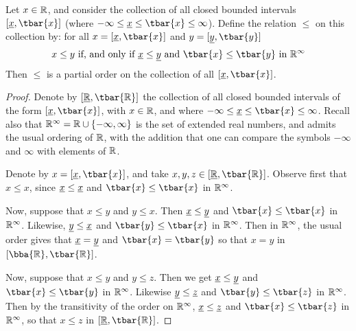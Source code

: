 \begin{proposition}\label{proposition_1.6}
  Let $x \in \mathbb{R}$, and consider the collection of all closed bounded
  intervals $[\bbar{x},\tbar{x}]$ (where $-\infty \leq \bbar{x} \leq
  \tbar{x} \leq \infty$). Define the relation $\leq$ on this collection
  by: for all $x=[\bbar{x},\tbar{x}]$ and $y=[\bbar{y},\tbar{y}]$
  \begin{equation*}
    x \leq y \text{ if, and only if } \bbar{x} \leq \bbar{y} \text{
    and } \tbar{x} \leq \tbar{y} \text{ in } \R^\infty
  \end{equation*}
  Then $\leq$ is a partial order on the collection of all
$[\bbar{x},\tbar{x}]$.
\end{proposition}
\begin{proof}
  Denote by $[\bbar{\R},\tbar{\R}]$ the collection of all closed
  bounded intervals of the form $[\bbar{x},\tbar{x}]$, with $x \in \mathbb{R}$,
  and where $-\infty \leq \bbar{x} \leq \tbar{x} \leq \infty$. Recall
  also that $\mathbb{R}^\infty=\mathbb{R} \cup \{-\infty,\infty\}$ is the set of
  extended real numbers, and admits the usual ordering of $\mathbb{R}$, with
  the addition that one can compare the symbols  $-\infty$ and
  $\infty$ with elements of $\mathbb{R}$.

  Denote by $x=[\bbar{x},\tbar{x}]$, and take $x,y,z \in
  [\bbar{\R},\tbar{\R}]$. Observe first that $x \leq x$, since
  $\underline{x} \leq \underline{x}$ and $\tbar{x} \leq \tbar{x}$ in $\mathbb{R}^\infty$.

  Now, suppose that $x \leq y$ and $y \leq x$. Then $\underline{x} \leq
  \underline{y}$ and $\tbar{x} \leq \tbar{x}$ in $\mathbb{R}^\infty$. Likewise,
  $\underline{y} \leq \underline{x}$ and $\tbar{y} \leq \tbar{x}$ in $\mathbb{R}^\infty$.
  Then in  $\mathbb{R}^\infty$, the usual order gives that $\underline{x}=\underline{y}$
  and $\tbar{x}=\tbar{y}$ so that $x=y$ in  $[\bba{\R},\tbar{\R}]$.

  Now, suppose that $x \leq y$ and $y \leq z$. Then we get $\underline{x}
  \leq \underline{y}$ and $\tbar{x} \leq \tbar{y}$ in $\mathbb{R}^\infty$. Likewise
  $\underline{y} \leq \underline{z}$ and $\tbar{y} \leq \tbar{z}$ in $\mathbb{R}^\infty$.
  Then by the transitivity of the order on $\mathbb{R}^\infty$, $\underline{x} \leq
  \underline{z}$ and $\tbar{x} \leq \tbar{z}$ in $\mathbb{R}^\infty$, so that $x \leq
  z$ in $[\bbar{\R},\tbar{\R}]$.
\end{proof}
